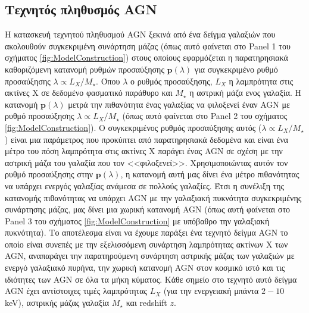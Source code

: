 
\subsection{Τεχνητός πληθυσμός \textlatin{AGN}}
Η κατασκευή τεχνητού πληθυσμού \textlatin{AGN} ξεκινά από ένα δείγμα γαλαξιών που ακολουθούν συγκεκριμένη συνάρτηση μάζας (όπως αυτό φαίνεται στο \textlatin{Panel 1} του σχήματος \ref{fig:ModelConstruction}) στους οποίους εφαρμόζεται η παρατηρησιακά καθοριζόμενη κατανομή ρυθμών προσαύξησης $\mathbf{p}(\lambda)$ για συγκεκριμένο ρυθμό προσαύξησης $\lambda \propto L_X/ M_{\star}$\cite{VAR}.
Όπου $\lambda$ ο ρυθμός προσαύξησης, $L_X$ η λαμπρότητα στις ακτίνες Χ σε δεδομένο φασματικό παράθυρο και $ M_{\star}$ η αστρική μάζα ενος γαλαξία. Η κατανομή $\mathbf{p}(\lambda)$ μετρά την πιθανότητα ένας γαλαξίας να φιλοξενεί έναν \textlatin{AGN} με ρυθμό προσαύξησης $\lambda \propto L_X/ M_{\star}$ (όπως αυτό φαίνεται στο \textlatin{Panel 2} του σχήματος \ref{fig:ModelConstruction})\cite{VAR}. Ο συγκεκριμένος ρυθμός προσαύξησης αυτός ($\lambda \propto L_X/ M_{\star}$) είναι μια παράμετρος που προκύπτει από παρατηρησιακά δεδομένα και είναι ένα μέτρο του πόση λαμπρότητα στις ακτίνες Χ παράγει ένας \textlatin{AGN} σε σχέση με την αστρική μάζα του γαλαξία που τον <<φιλοξενεί>>. Χρησιμοποιώντας αυτόν τον ρυθμό προσαύξησης στην $\mathbf{p}(\lambda)$, η κατανομή αυτή μας δίνει ένα μέτρο πιθανότητας να υπάρχει ενεργός γαλαξίας ανάμεσα σε πολλούς γαλαξίες. 
Έτσι η συνέλιξη της κατανομής πιθανότητας να υπάρχει \textlatin{AGN} με την γαλαξιακή πυκνότητα συγκεκριμένης συνάρτησης μάζας, μας δίνει μια χωρική κατανομή \textlatin{AGN} (όπως αυτή φαίνεται στο \textlatin{Panel 3} του σχήματος \ref{fig:ModelConstruction} με υπόβαθρο την γαλαξιακή πυκνότητα)\cite{VAR}. Το αποτέλεσμα είναι να έχουμε παράξει ένα τεχνητό δείγμα \textlatin{AGN} το οποίο είναι συνεπές με την εξελισσόμενη συνάρτηση λαμπρότητας ακτίνων Χ των \textlatin{AGN}, αναπαράγει την παρατηρούμενη συνάρτηση αστρικής μάζας των γαλαξιών με ενεργό γαλαξιακό πυρήνα, την χωρική κατανομή \textlatin{AGN} στον κοσμικό ιστό και τις ιδιότητες των \textlatin{AGN} σε όλα τα μήκη κύματος\cite{VAR}.
Κάθε σημείο στο τεχνητό αυτό δείγμα \textlatin{AGN} έχει αντίστοιχες τιμές λαμπρότητας $L_X$ (για την ενεργειακή μπάντα $2-10$ \textlatin{keV}), αστρικής μάζας γαλαξία $M_{\star}$ και \textlatin{redshift} $z$.

